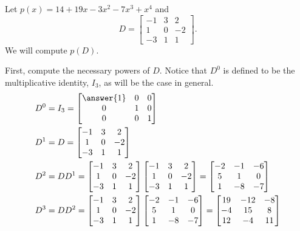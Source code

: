 \documentclass{ximera}
\begin{document}
\begin{example}

Let $p(x)=14+19x-3x^2-7x^3+x^4$ and
\[
D=\begin{bmatrix}-1 & 3 & 2\\1 & 0 & -2\\-3 & 1 & 1\end{bmatrix}.
\]
We will compute $p(D)$.

First, compute the necessary powers of $D$.  Notice that $D^0$ is defined to be the multiplicative identity, $I_3$, as will be the case in general.
\begin{align*}
D^0&=I_3=\begin{bmatrix}\answer{1} & 0 & 0\\0 & 1 & 0\\0 & 0 & 1\end{bmatrix}\\
D^1&=D=\begin{bmatrix}-1 & 3 & 2\\1 & 0 & -2\\-3 & 1 & 1\end{bmatrix}\\
D^2&=DD^1=
\begin{bmatrix}-1 & 3 & 2\\1 & 0 & -2\\-3 & 1 & 1\end{bmatrix}
\begin{bmatrix}-1 & 3 & 2\\1 & 0 & -2\\-3 & 1 & 1\end{bmatrix}
=
\begin{bmatrix}-2 & -1 & -6\\5 & 1 & 0\\1 & -8 & -7\end{bmatrix}\\
D^3&=DD^2=
\begin{bmatrix}-1 & 3 & 2\\1 & 0 & -2\\-3 & 1 & 1\end{bmatrix}
\begin{bmatrix}-2 & -1 & -6\\5 & 1 & 0\\1 & -8 & -7\end{bmatrix}
=
\begin{bmatrix}19 & -12 & -8\\-4 & 15 & 8\\12 & -4 & 11\end{bmatrix}\\

\end{align*}
\end{example}
\end{document}
